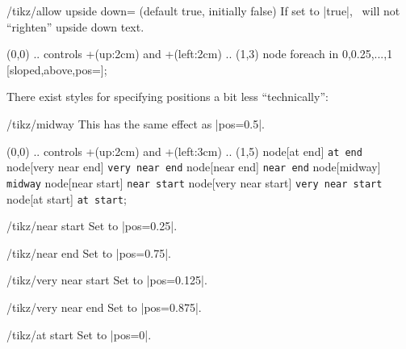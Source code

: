 \begin{key}{/tikz/allow upside down= (default true, initially false)}
  If set to |true|, \tikzname\ will not ``righten'' upside down text.
\begin{codeexample}[]
  \draw (0,0) .. controls +(up:2cm) and +(left:2cm) .. (1,3)
    node foreach \p in {0,0.25,...,1} [sloped,above,pos=\p]{\p};
\end{codeexample}
\begin{codeexample}[]
\end{codeexample}
\end{key}


There exist styles for specifying positions a bit less ``technically'':
\begin{stylekey}{/tikz/midway}
  This has the same effect as |pos=0.5|.
\begin{codeexample}[]
\tikz \draw (0,0) .. controls +(up:2cm) and +(left:3cm) .. (1,5)
       node[at end]          {\texttt{at end}}
       node[very near end]   {\texttt{very near end}}
       node[near end]        {\texttt{near end}}
       node[midway]          {\texttt{midway}}
       node[near start]      {\texttt{near start}}
       node[very near start] {\texttt{very near start}}
       node[at start]        {\texttt{at start}};
\end{codeexample}
\end{stylekey}

\begin{stylekey}{/tikz/near start}
  Set to |pos=0.25|.
\end{stylekey}

\begin{stylekey}{/tikz/near end}
  Set to |pos=0.75|.
\end{stylekey}

\begin{stylekey}{/tikz/very near start}
  Set to |pos=0.125|.
\end{stylekey}

\begin{stylekey}{/tikz/very near end}
  Set to |pos=0.875|.
\end{stylekey}

\begin{stylekey}{/tikz/at start}
  Set to |pos=0|.
\end{stylekey}

